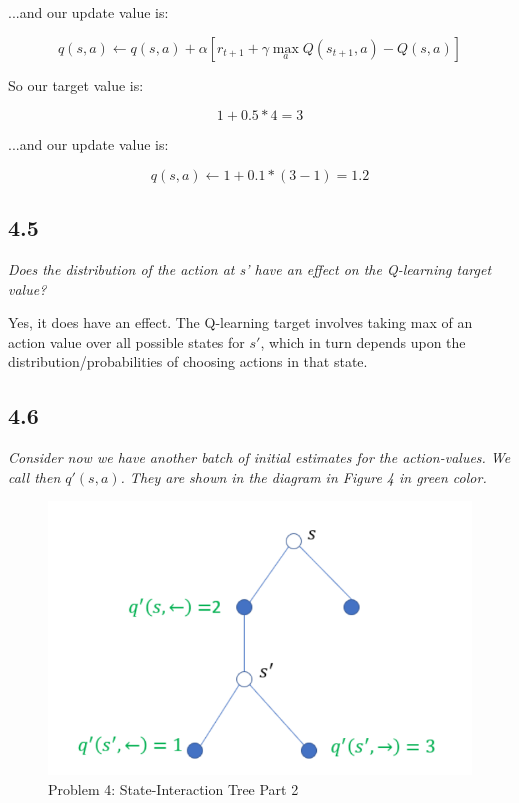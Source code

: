 \documentclass{article}
\begin{document}
...and our update value is:

\begin{equation}
    q(s, a) \leftarrow q(s, a) + \alpha \left[r_{t+1} + \gamma \max_{a} Q(s_{t+1}, a) - Q(s, a)\right]
\end{equation}

So our target value is:

\begin{equation}
    1 + 0.5 * 4 = 3
\end{equation}

...and our update value is:

\begin{equation}
    q(s,a) \leftarrow 1 + 0.1 * (3 - 1) = 1.2
\end{equation}

\subsection*{4.5}

\textit{Does the distribution of the action at s' have an effect on the Q-learning target value?}

Yes, it does have an effect. The Q-learning target involves taking max of an action value over all possible states for $s'$, which in turn depends upon the distribution/probabilities of choosing actions in that state.

\subsection*{4.6}
\textit{Consider now we have another batch of initial estimates for the action-values. We call then $q'(s,a)$. They are shown in the diagram in Figure 4 in green color.}

\begin{figure}
    \centering
    \includegraphics[width=.8\linewidth]{imgs/midterm.4.2.png}
    \caption{Problem 4: State-Interaction Tree Part 2}
\end{figure}
\end{document}

